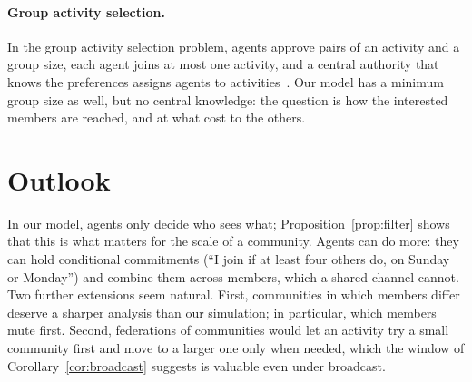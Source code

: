 \documentclass[11pt]{article}
\theoremstyle{definition}
\begin{document}
\paragraph{Group activity selection.}
In the group activity selection problem, agents approve pairs of an activity and a group size, each agent joins at most one activity, and a central authority that knows the preferences assigns agents to activities~\cite{darmann2012gasp}. Our model has a minimum group size as well, but no central knowledge: the question is how the interested members are reached, and at what cost to the others.

\section{Outlook}
In our model, agents only decide who sees what; Proposition~\ref{prop:filter} shows that this is what matters for the scale of a community. Agents can do more: they can hold conditional commitments (``I join if at least four others do, on Sunday or Monday'') and combine them across members, which a shared channel cannot. Two further extensions seem natural. First, communities in which members differ deserve a sharper analysis than our simulation; in particular, which members mute first. Second, federations of communities would let an activity try a small community first and move to a larger one only when needed, which the window of Corollary~\ref{cor:broadcast} suggests is valuable even under broadcast.



\end{document}
